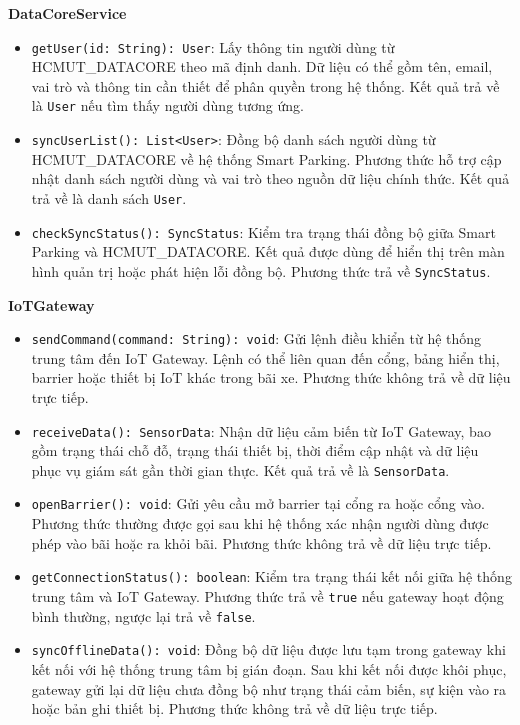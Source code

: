 \noindent\textbf{DataCoreService}
\begin{itemize}
    \item \texttt{getUser(id: String): User}: Lấy thông tin người dùng từ \mbox{HCMUT\_DATACORE} theo mã định danh. Dữ liệu có thể gồm tên, email, vai trò và thông tin cần thiết để phân quyền trong hệ thống. Kết quả trả về là \texttt{User} nếu tìm thấy người dùng tương ứng.
    \item \texttt{syncUserList(): List<User>}: Đồng bộ danh sách người dùng từ \mbox{HCMUT\_DATACORE} về hệ thống Smart Parking. Phương thức hỗ trợ cập nhật danh sách người dùng và vai trò theo nguồn dữ liệu chính thức. Kết quả trả về là danh sách \texttt{User}.
    \item \texttt{checkSyncStatus(): SyncStatus}: Kiểm tra trạng thái đồng bộ giữa Smart Parking và \mbox{HCMUT\_DATACORE}. Kết quả được dùng để hiển thị trên màn hình quản trị hoặc phát hiện lỗi đồng bộ. Phương thức trả về \texttt{SyncStatus}.
\end{itemize}

\noindent\textbf{IoTGateway}
\begin{itemize}
    \item \texttt{sendCommand(command: String): void}: Gửi lệnh điều khiển từ hệ thống trung tâm đến IoT Gateway. Lệnh có thể liên quan đến cổng, bảng hiển thị, barrier hoặc thiết bị IoT khác trong bãi xe. Phương thức không trả về dữ liệu trực tiếp.
    \item \texttt{receiveData(): SensorData}: Nhận dữ liệu cảm biến từ IoT Gateway, bao gồm trạng thái chỗ đỗ, trạng thái thiết bị, thời điểm cập nhật và dữ liệu phục vụ giám sát gần thời gian thực. Kết quả trả về là \texttt{SensorData}.
    \item \texttt{openBarrier(): void}: Gửi yêu cầu mở barrier tại cổng ra hoặc cổng vào. Phương thức thường được gọi sau khi hệ thống xác nhận người dùng được phép vào bãi hoặc ra khỏi bãi. Phương thức không trả về dữ liệu trực tiếp.
    \item \texttt{getConnectionStatus(): boolean}: Kiểm tra trạng thái kết nối giữa hệ thống trung tâm và IoT Gateway. Phương thức trả về \texttt{true} nếu gateway hoạt động bình thường, ngược lại trả về \texttt{false}.
    \item \texttt{syncOfflineData(): void}: Đồng bộ dữ liệu được lưu tạm trong gateway khi kết nối với hệ thống trung tâm bị gián đoạn. Sau khi kết nối được khôi phục, gateway gửi lại dữ liệu chưa đồng bộ như trạng thái cảm biến, sự kiện vào ra hoặc bản ghi thiết bị. Phương thức không trả về dữ liệu trực tiếp.
\end{itemize}

